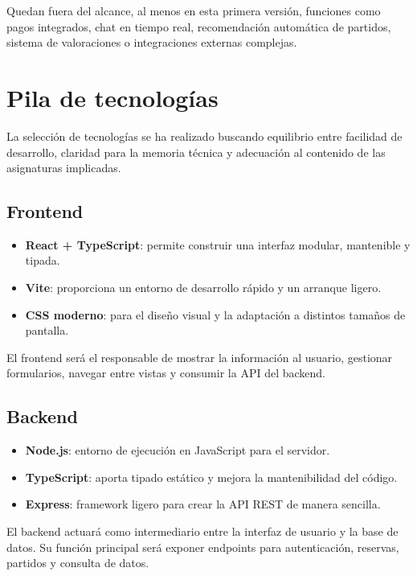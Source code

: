 \documentclass[12pt,a4paper]{article}
\begin{document}
Quedan fuera del alcance, al menos en esta primera versión, funciones como pagos integrados, chat en tiempo real, recomendación automática de partidos, sistema de valoraciones o integraciones externas complejas.

\section{Pila de tecnologías}

La selección de tecnologías se ha realizado buscando equilibrio entre facilidad de desarrollo, claridad para la memoria técnica y adecuación al contenido de las asignaturas implicadas.

\subsection{Frontend}
\begin{itemize}[leftmargin=*]
    \item \textbf{React + TypeScript}: permite construir una interfaz modular, mantenible y tipada.
    \item \textbf{Vite}: proporciona un entorno de desarrollo rápido y un arranque ligero.
    \item \textbf{CSS moderno}: para el diseño visual y la adaptación a distintos tamaños de pantalla.
\end{itemize}

El frontend será el responsable de mostrar la información al usuario, gestionar formularios, navegar entre vistas y consumir la API del backend.

\subsection{Backend}
\begin{itemize}[leftmargin=*]
    \item \textbf{Node.js}: entorno de ejecución en JavaScript para el servidor.
    \item \textbf{TypeScript}: aporta tipado estático y mejora la mantenibilidad del código.
    \item \textbf{Express}: framework ligero para crear la API REST de manera sencilla.
\end{itemize}

El backend actuará como intermediario entre la interfaz de usuario y la base de datos. Su función principal será exponer endpoints para autenticación, reservas, partidos y consulta de datos.
\end{document}
